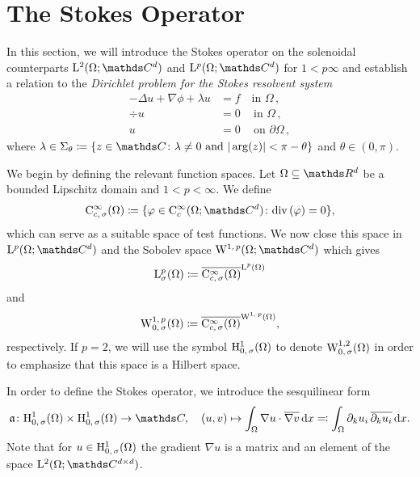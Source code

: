 \section{The Stokes Operator}
\label{sec:stokesOperator}

In this section, we will introduce the Stokes operator on the solenoidal counterparts $\Ell^2(\Omega; \C^d)$ and $\Ell^p(\Omega; \C^d)$ for $1 < p \infty$ and establish a relation to the \emph{Dirichlet problem for the Stokes resolvent system}
\begin{align}
  -\Delta u + \nabla \phi + \lambda u &= f  \quad\text{in } \Omega\,, \nonumber\\
  \div u &= 0                               \,\quad\text{in } \Omega\,, \label{eq:stokesResolventSystem} \\
  u &= 0 \,\quad\text{on } \partial\Omega\,, \nonumber
\end{align}
where $\lambda \in \Sigma_\theta \coloneqq \{ z \in \C \colon \lambda \neq 0 \text{ and } |\arg(z) | < \pi - \theta \}$ and $\theta \in (0, \pi)$.

We begin by defining the relevant function spaces.
Let $\Omega \subseteq \R^d$ be a bounded Lipschitz domain and $1 < p < \infty$. 
We define
\begin{align*}
  \CC_{c,\, \sigma}^\infty(\Omega) \coloneqq \{ \varphi \in \CC_c^\infty(\Omega; \C^d) \colon \div(\varphi) = 0 \},
\end{align*}
which can serve as a suitable space of test functions.
We now close this space in $\Ell^p(\Omega; \C^d)$ and the Sobolev space $\WW^{1,\,p}(\Omega; \C^d)$ which gives
\begin{align*}
  \mathrm{L}_\sigma^p(\Omega) \coloneqq \overline{\mathrm{C}_{c,\,\sigma}^\infty(\Omega)}^{\mathrm{L}^p(\Omega)}
\end{align*}
and
\begin{align*}
  \mathrm{W}_{0,\,\sigma}^{1,\,p}(\Omega) \coloneqq \overline{\mathrm{C}_{c,\,\sigma}^\infty(\Omega)}^{\mathrm{W}^{1,\,p}(\Omega)},
\end{align*}
respectively.
If $p = 2$, we will use the symbol $\mathrm{H}_{0,\,\sigma}^1(\Omega)$ to denote $\mathrm{W}_{0,\,\sigma}^{1,2}(\Omega)$ in order to emphasize that this space is a Hilbert space.

In order to define the Stokes operator, we introduce the sesquilinear form
\begin{align*}
  \aform \colon \HH_{0,\,\sigma}^1(\Omega) \times \HH_{0,\,\sigma}^1(\Omega) \to \C, \quad (u,v) \mapsto \int_\Omega \nabla u \cdot \overline{\nabla v} \d x \eqqcolon \int_\Omega \partial_k u_i \, \overline{\partial_k u_i} \d x.
\end{align*}
Note that for $u \in \mathrm{H}_{0,\,\sigma}^1(\Omega)$ the gradient $\nabla u$ is a matrix and an element of the space $\Ell^2(\Omega; \C^{d \times d})$.

